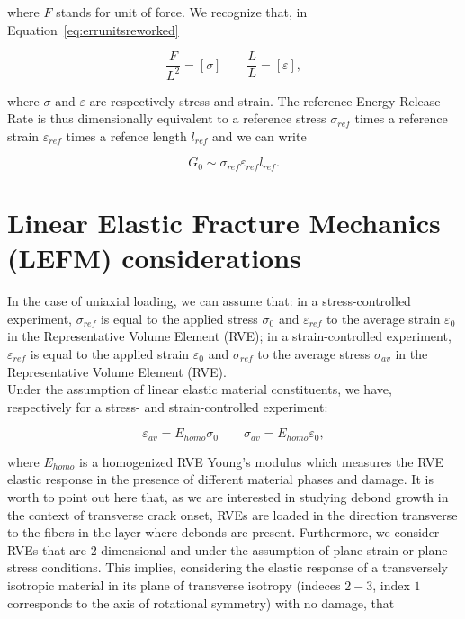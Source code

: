 \documentclass[review]{elsarticle}
\begin{document}
where $F$ stands for unit of force. We recognize that, in Equation~\ref{eq:errunitsreworked}

\begin{equation}\label{eq:sigmaepsunits}
\frac{F}{L^{2}}=\left[\sigma\right]\qquad\frac{L}{L}=\left[\varepsilon\right],
\end{equation}

where $\sigma$ and $\varepsilon$ are respectively stress and strain. The reference Energy Release Rate is thus dimensionally equivalent to a reference stress $\sigma_{ref}$ times a reference strain $\varepsilon_{ref}$ times a refence length $l_{ref}$ and we can write

\begin{equation}\label{eq:G}
G_{0}\sim\sigma_{ref}\varepsilon_{ref}l_{ref}.
\end{equation}

\section{Linear Elastic Fracture Mechanics (LEFM) considerations}

In the case of uniaxial loading, we can assume that: in a stress-controlled experiment, $\sigma_{ref}$ is equal to the applied stress $\sigma_{0}$ and $\varepsilon_{ref}$ to the average strain $\varepsilon_{0}$ in the Representative Volume Element (RVE); in a strain-controlled experiment, $\varepsilon_{ref}$ is equal to the applied strain $\varepsilon_{0}$ and $\sigma_{ref}$ to the average stress $\sigma_{av}$ in the Representative Volume Element (RVE).\\
Under the assumption of linear elastic material constituents, we have, respectively for a stress- and strain-controlled experiment:

\begin{equation}\label{eq:elasticresponse}
\varepsilon_{av}=E_{homo}\sigma_{0}\qquad\sigma_{av}=E_{homo}\varepsilon_{0},
\end{equation}

where $E_{homo}$ is a homogenized RVE Young's modulus which measures the RVE elastic response in the presence of different material phases and damage. It is worth to point out here that, as we are interested in studying debond growth in the context of transverse crack onset, RVEs are loaded in the direction transverse to the fibers in the layer where debonds are present. Furthermore, we consider RVEs that are 2-dimensional and under the assumption of plane strain or plane stress conditions. This implies, considering the elastic response of a transversely isotropic material in its plane of transverse isotropy (indeces $2-3$, index $1$ corresponds to the axis of rotational symmetry) with no damage, that~\cite{Timoshenko1987,Mantic2009}
\end{document}
